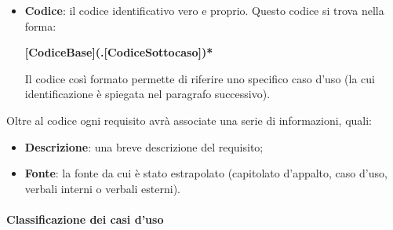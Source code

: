 \begin{itemize}
    \item \textbf{Codice}: il codice identificativo vero e proprio. Questo codice si trova nella forma:
    \begin{center}
        \textbf{[CodiceBase](.[CodiceSottocaso])*}
    \end{center}
    Il codice così formato permette di riferire uno specifico caso d'uso (la cui identificazione è spiegata nel paragrafo successivo).
\end{itemize}

Oltre al codice ogni requisito avrà associate una serie di informazioni, quali:
\begin{itemize}
    \item \textbf{Descrizione}: una breve descrizione del requisito;
    \item \textbf{Fonte}: la fonte da cui è stato estrapolato (capitolato d'appalto, caso d'uso, verbali interni o verbali esterni).
\end{itemize}

\paragraph{Classificazione dei casi d'uso}

